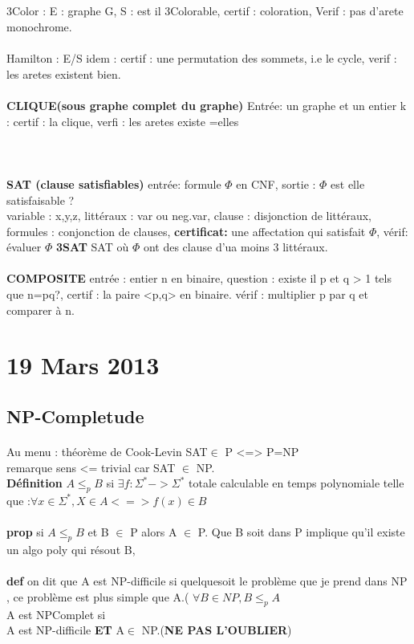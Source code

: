 \documentclass{article}
\begin{document}
\subparagraph{} 3Color : E : graphe G, S : est il 3Colorable, certif : coloration, Verif : pas d'arete monochrome.\\\\Hamilton : E/S idem : certif  : une permutation des sommets, i.e le cycle, verif : les aretes existent bien.\\\\\textbf{CLIQUE(sous graphe complet du graphe)} Entrée:  un graphe et un entier k :  certif : la clique, verfi : les aretes existe =elles\\
\\
\\
\\\textbf{SAT (clause satisfiables)} entrée: formule $\Phi$ en CNF, sortie  : $\Phi$ est elle satisfaisable ? \\ variable : x,y,z, littéraux : var ou neg.var, clause : disjonction de littéraux, formules : conjonction de clauses, \textbf{certificat:} une affectation qui satisfait $\Phi$, vérif: évaluer $\Phi$ \textbf{3SAT} SAT où $\Phi$ ont des clause d'ua moins 3 littéraux.\\\\
\textbf{COMPOSITE} entrée : entier n en binaire, question : existe il p et q > 1 tels que n=pq?, certif : la paire <p,q> en binaire. vérif : multiplier p par q et comparer à n.

\section{19 Mars 2013}
\subsection{NP-Completude}
\paragraph{} Au menu : théorème de Cook-Levin SAT$\in$ P <=> P=NP\\remarque sens <= trivial car SAT $\in$ NP.\\\textbf{Définition} $A \leq_p B $ si $\exists f : \Sigma^* -> \Sigma^*$ totale calculable en temps polynomiale telle que :$\forall x \in \Sigma^*, X\in A <=> f(x) \in B$ \\\\\textbf{prop} si $A \leq_p B $ et B $\in$ P alors A $\in$ P. Que B soit dans P implique qu'il existe un algo poly qui résout B, \\\\\textbf{def} on dit que A est NP-difficile si quelquesoit le problème que je prend dans NP , ce problème est plus simple que A.( $\forall B \in NP, B \leq_p A$ \\A est NPComplet si \\A est NP-difficile \textbf{ET} A$\in$ NP.(\textbf{NE PAS L'OUBLIER})
\end{document}
